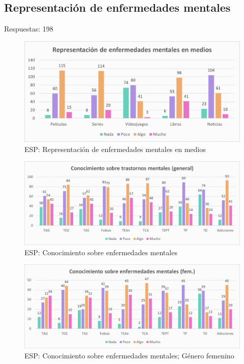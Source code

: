 \documentclass[12pt, a4paper,twoside,titlepage]{book}
\begin{document}
\subsection{Representación de enfermedades mentales}
Respuestas: 198


\begin{figure}
	\centering
	\includegraphics[width=1\linewidth]{ANEXO ESP/7AnexESPMedios}
	\caption{ESP: Representación de enfermedades mentales en medios}
	\label{fig:ESPMedios}
\end{figure}


\begin{figure}
	\centering
	\includegraphics[width=1\linewidth]{ANEXO ESP/8AnexESPCon}
	\caption{ESP: Conocimiento sobre enfermedades mentales}
	\label{fig:ESPCon}
\end{figure}

\begin{figure}
	\centering
	\includegraphics[width=1\linewidth]{ANEXO ESP/9AnexESPConfem}
	\caption{ESP: Conocimiento sobre enfermedades mentales; Género femenino}
	\label{fig:ESPConfem}
\end{figure}
\end{document}
